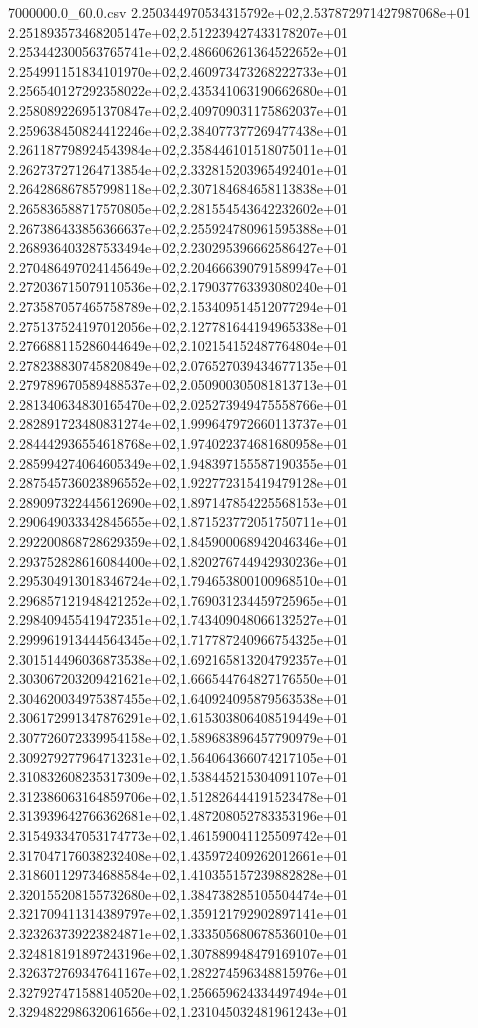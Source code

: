 \begin{filecontents*}{7000000.0_60.0.csv}
2.250344970534315792e+02,2.537872971427987068e+01
2.251893573468205147e+02,2.512239427433178207e+01
2.253442300563765741e+02,2.486606261364522652e+01
2.254991151834101970e+02,2.460973473268222733e+01
2.256540127292358022e+02,2.435341063190662680e+01
2.258089226951370847e+02,2.409709031175862037e+01
2.259638450824412246e+02,2.384077377269477438e+01
2.261187798924543984e+02,2.358446101518075011e+01
2.262737271264713854e+02,2.332815203965492401e+01
2.264286867857998118e+02,2.307184684658113838e+01
2.265836588717570805e+02,2.281554543642232602e+01
2.267386433856366637e+02,2.255924780961595388e+01
2.268936403287533494e+02,2.230295396662586427e+01
2.270486497024145649e+02,2.204666390791589947e+01
2.272036715079110536e+02,2.179037763393080240e+01
2.273587057465758789e+02,2.153409514512077294e+01
2.275137524197012056e+02,2.127781644194965338e+01
2.276688115286044649e+02,2.102154152487764804e+01
2.278238830745820849e+02,2.076527039434677135e+01
2.279789670589488537e+02,2.050900305081813713e+01
2.281340634830165470e+02,2.025273949475558766e+01
2.282891723480831274e+02,1.999647972660113737e+01
2.284442936554618768e+02,1.974022374681680958e+01
2.285994274064605349e+02,1.948397155587190355e+01
2.287545736023896552e+02,1.922772315419479128e+01
2.289097322445612690e+02,1.897147854225568153e+01
2.290649033342845655e+02,1.871523772051750711e+01
2.292200868728629359e+02,1.845900068942046346e+01
2.293752828616084400e+02,1.820276744942930236e+01
2.295304913018346724e+02,1.794653800100968510e+01
2.296857121948421252e+02,1.769031234459725965e+01
2.298409455419472351e+02,1.743409048066132527e+01
2.299961913444564345e+02,1.717787240966754325e+01
2.301514496036873538e+02,1.692165813204792357e+01
2.303067203209421621e+02,1.666544764827176550e+01
2.304620034975387455e+02,1.640924095879563538e+01
2.306172991347876291e+02,1.615303806408519449e+01
2.307726072339954158e+02,1.589683896457790979e+01
2.309279277964713231e+02,1.564064366074217105e+01
2.310832608235317309e+02,1.538445215304091107e+01
2.312386063164859706e+02,1.512826444191523478e+01
2.313939642766362681e+02,1.487208052783353196e+01
2.315493347053174773e+02,1.461590041125509742e+01
2.317047176038232408e+02,1.435972409262012661e+01
2.318601129734688584e+02,1.410355157239882828e+01
2.320155208155732680e+02,1.384738285105504474e+01
2.321709411314389797e+02,1.359121792902897141e+01
2.323263739223824871e+02,1.333505680678536010e+01
2.324818191897243196e+02,1.307889948479169107e+01
2.326372769347641167e+02,1.282274596348815976e+01
2.327927471588140520e+02,1.256659624334497494e+01
2.329482298632061656e+02,1.231045032481961243e+01

\end{filecontents*}
